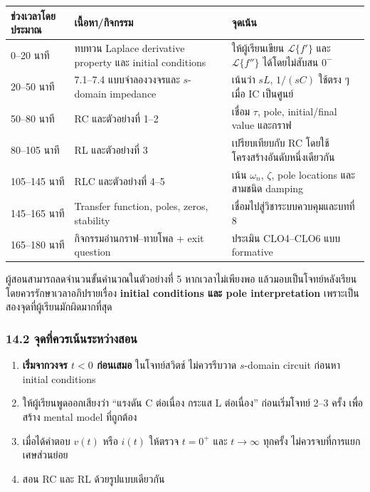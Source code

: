 \begin{table}[htbp]
    \centering
    \small
    \setlength{\tabcolsep}{4pt}
    \begin{tabularx}{\textwidth}{L{0.16\textwidth} L{0.34\textwidth} Y}
        \hline
        \textbf{ช่วงเวลาโดยประมาณ} & \textbf{เนื้อหา/กิจกรรม} & \textbf{จุดเน้น} \\
        –20 นาที & ทบทวน Laplace derivative property และ initial conditions & ให้ผู้เรียนเขียน $\mathcal{L}\{f'\}$ และ $\mathcal{L}\{f''\}$ ได้โดยไม่สับสน $0^-$ \\
        20–50 นาที & 7.1–7.4 แบบจำลองวงจรและ $s$-domain impedance & เน้นว่า $sL$, $1/(sC)$ ใช้ตรง ๆ เมื่อ IC เป็นศูนย์ \\
        50–80 นาที & RC และตัวอย่างที่ 1–2 & เชื่อม $\tau$, pole, initial/final value และกราฟ \\
        80–105 นาที & RL และตัวอย่างที่ 3 & เปรียบเทียบกับ RC โดยใช้โครงสร้างอันดับหนึ่งเดียวกัน \\
        105–145 นาที & RLC และตัวอย่างที่ 4–5 & เน้น $\omega_n$, $\zeta$, pole locations และสามชนิด damping \\
        145–165 นาที & Transfer function, poles, zeros, stability & เชื่อมไปสู่วิชาระบบควบคุมและบทที่ 8 \\
        165–180 นาที & กิจกรรมอ่านกราฟ–ทายโพล + exit question & ประเมิน CLO4–CLO6 แบบ formative \\
        \hline
    \end{tabularx}
\end{table}

ผู้สอนสามารถลดจำนวนขั้นคำนวณในตัวอย่างที่ 5 หากเวลาไม่เพียงพอ แล้วมอบเป็นโจทย์หลังเรียน โดยควรรักษาเวลาอภิปรายเรื่อง \textbf{initial conditions และ pole interpretation} เพราะเป็นสองจุดที่ผู้เรียนมักผิดมากที่สุด

\subsubsection{14.2 จุดที่ควรเน้นระหว่างสอน}

\begin{enumerate}
    \item \textbf{เริ่มจากวงจร $t<0$ ก่อนเสมอ} ในโจทย์สวิตช์ ไม่ควรรีบวาด $s$-domain circuit ก่อนหา initial conditions
    \item ให้ผู้เรียนพูดออกเสียงว่า “แรงดัน C ต่อเนื่อง กระแส L ต่อเนื่อง” ก่อนเริ่มโจทย์ 2–3 ครั้ง เพื่อสร้าง mental model ที่ถูกต้อง
    \item เมื่อได้คำตอบ $v(t)$ หรือ $i(t)$ ให้ตรวจ $t=0^+$ และ $t\to\infty$ ทุกครั้ง ไม่ควรจบที่การแยกเศษส่วนย่อย
    \item สอน RC และ RL ด้วยรูปแบบเดียวกัน
\end{enumerate}

